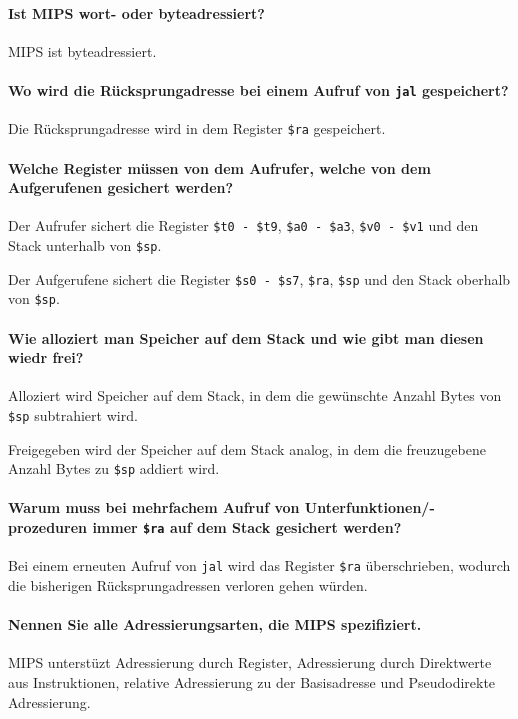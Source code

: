			\paragraph{Ist MIPS wort- oder byteadressiert?}
				MIPS ist byteadressiert.

			\paragraph{Wo wird die Rücksprungadresse bei einem Aufruf von \texttt{jal} gespeichert?}
				Die Rücksprungadresse wird in dem Register \texttt{\$ra} gespeichert.

			\paragraph{Welche Register müssen von dem Aufrufer, welche von dem Aufgerufenen gesichert werden?}
				Der Aufrufer sichert die Register \texttt{\$t0 - \$t9}, \texttt{\$a0 - \$a3}, \texttt{\$v0 - \$v1} und den Stack unterhalb von \texttt{\$sp}.

				Der Aufgerufene sichert die Register \texttt{\$s0 - \$s7}, \texttt{\$ra}, \texttt{\$sp} und den Stack oberhalb von \texttt{\$sp}.

			\paragraph{Wie alloziert man Speicher auf dem Stack und wie gibt man diesen wiedr frei?}
				Alloziert wird Speicher auf dem Stack, in dem die gewünschte Anzahl Bytes von \texttt{\$sp} subtrahiert wird.

				Freigegeben wird der Speicher auf dem Stack analog, in dem die freuzugebene Anzahl Bytes zu \texttt{\$sp} addiert wird.

			\paragraph{Warum muss bei mehrfachem Aufruf von Unterfunktionen/-prozeduren immer \texttt{\$ra} auf dem Stack gesichert werden?}
				Bei einem erneuten Aufruf von \texttt{jal} wird das Register \texttt{\$ra} überschrieben, wodurch die bisherigen Rücksprungadressen verloren gehen würden.

			\paragraph{Nennen Sie alle Adressierungsarten, die MIPS spezifiziert.}
				MIPS unterstüzt Adressierung durch Register, Adressierung durch Direktwerte aus Instruktionen, relative Adressierung zu der Basisadresse und Pseudodirekte Adressierung.

